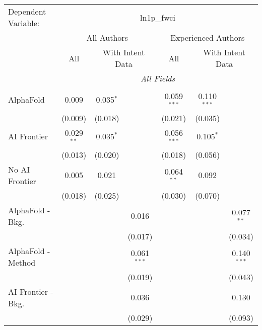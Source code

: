 \begingroup
\centering
\begin{tabular}{lcccccc}
   \tabularnewline \midrule \midrule
   Dependent Variable: & \multicolumn{6}{c}{ln1p\_fwci}\\
 & \multicolumn{3}{c}{All Authors} & \multicolumn{3}{c}{Experienced Authors} \\
\cmidrule(lr){2-4} \cmidrule(lr){5-7}
 & \multicolumn{1}{c}{All} & \multicolumn{2}{c}{With Intent Data} & \multicolumn{1}{c}{All} & \multicolumn{2}{c}{With Intent Data} \\
\cmidrule(lr){2-2} \cmidrule(lr){3-4} \cmidrule(lr){5-5} \cmidrule(lr){6-7}
 & \multicolumn{6}{c}{\textit{All Fields}} \\ \\
   AlphaFold               & 0.009        & 0.035$^{*}$ &               & 0.059$^{***}$ & 0.110$^{***}$ &   \\   
                           & (0.009)      & (0.018)     &               & (0.021)       & (0.035)       &   \\   
   AI Frontier             & 0.029$^{**}$ & 0.035$^{*}$ &               & 0.056$^{***}$ & 0.105$^{*}$   &   \\   
                           & (0.013)      & (0.020)     &               & (0.018)       & (0.056)       &   \\   
   No AI Frontier          & 0.005        & 0.021       &               & 0.064$^{**}$  & 0.092         &   \\   
                           & (0.018)      & (0.025)     &               & (0.030)       & (0.070)       &   \\   
   AlphaFold - Bkg.        &              &             & 0.016         &               &               & 0.077$^{**}$\\   
                           &              &             & (0.017)       &               &               & (0.034)\\   
   AlphaFold - Method      &              &             & 0.061$^{***}$ &               &               & 0.140$^{***}$\\   
                           &              &             & (0.019)       &               &               & (0.043)\\   
   AI Frontier - Bkg.      &              &             & 0.036         &               &               & 0.130\\   
                           &              &             & (0.029)       &               &               & (0.093)\\   

\end{tabular}
